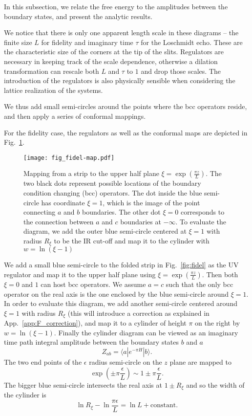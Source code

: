 
In this subsection, we relate the free energy to the amplitudes between the boundary states, and present the analytic results. 

We notice that there is only one apparent length scale in these diagrams -- the finite size $L$ for fidelity and imaginary time $\tau$ for the Loschmidt echo. These are the characteristic size of the corners at the tip of the slits. Regulators are necessary in keeping track of the scale dependence, otherwise a dilation transformation can rescale both $L$ and $\tau$ to $1$ and drop those scales. The introduction of the regulators is also physically sensible when considering the lattice realization of the systems. 

We thus add small semi-circles around the points where the bcc operators reside, and then apply a series of conformal mappings. 

For the fidelity case, the regulators as well as the conformal maps are depicted in Fig.~\ref{fig:fidel-map}. 
\begin{figure}[h]
\centering
\texttt{[image: fig\_fidel-map.pdf]}
\caption{Mapping from a strip to the upper half plane $\xi  = \exp( \frac{\pi z}{L} ) $. The two black dots represent possible locations of the boundary condition changing (bcc) operators. The dot inside the blue semi-circle has coordinate $\xi = 1$, which is the image of the point connecting $a$ and $b$ boundaries. The other dot $\xi = 0$ corresponds to the connection between $a$ and $c$ boundaries at $- \infty$. To evaluate the diagram, we add the outer blue semi-circle centered at $\xi = 1$ with radius $R_{\xi}$ to be the IR cut-off and map it to the cylinder with $w = \ln(\xi - 1)$}
\label{fig:fidel-map}
\end{figure}
We add a small blue semi-circle to the folded strip in Fig.~\ref{fig:fidel} as the UV regulator and map it to the upper half plane using $\xi  = \exp( \frac{\pi z}{L} )$. Then both $\xi = 0$ and $1$ can host bcc operators. We assume $a = c$ such that the only bcc operator on the real axis is the one enclosed by the blue semi-circle around $\xi = 1$. In order to evaluate this diagram, we add another semi-circle centered around $\xi = 1$ with radius $R_{\xi}$ (this will introduce a correction as explained in App.~\ref{app:F_correction}), and map it to a cylinder of height $\pi$ on the right by $w = \ln ( \xi- 1)$. Finally the cylinder diagram can be viewed as an imaginary time path integral amplitude between the boundary states $b$ and $a$
\begin{equation}
\label{eq:partition_fun}
Z_{ab} = \langle a | e^{-\pi H } |b \rangle.
\end{equation}
The two end points of the $\epsilon$ radius semi-circle on the $z$ plane are mapped to
\begin{equation}
\exp( \pm \pi \frac{\epsilon}{ L}  ) \sim 1 \pm \pi \frac{\epsilon}{L} .
\end{equation}
The bigger blue semi-circle intersects the real axis at $1 \pm R_{\xi}$ and so the width of the cylinder is 
\begin{equation}
\label{eq:fidel_cyd_width}
\ln R_{\xi} - \ln \frac{\pi \epsilon}{L} = \ln L + \text{constant}.
\end{equation}

